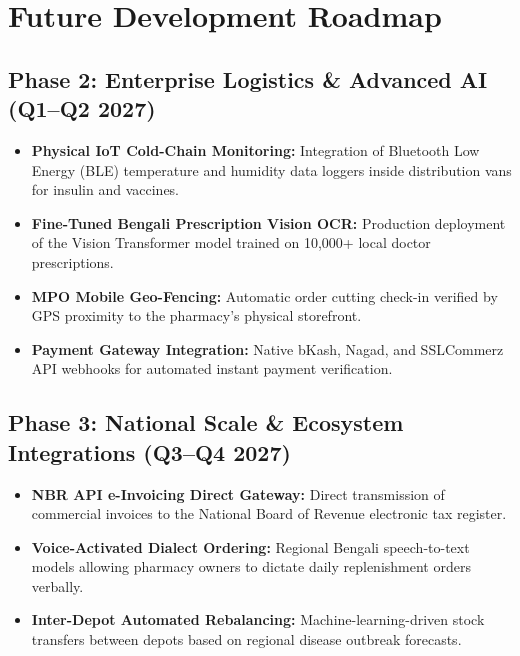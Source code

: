 \documentclass[10pt,a4paper]{article}
\begin{document}
\section{Future Development Roadmap}

\subsection{Phase 2: Enterprise Logistics \& Advanced AI (Q1--Q2 2027)}
\begin{itemize}[leftmargin=*]
    \item[$\square$] \textbf{Physical IoT Cold-Chain Monitoring:} Integration of Bluetooth Low Energy (BLE) temperature and humidity data loggers inside distribution vans for insulin and vaccines.
    \item[$\square$] \textbf{Fine-Tuned Bengali Prescription Vision OCR:} Production deployment of the Vision Transformer model trained on 10,000+ local doctor prescriptions.
    \item[$\square$] \textbf{MPO Mobile Geo-Fencing:} Automatic order cutting check-in verified by GPS proximity to the pharmacy's physical storefront.
    \item[$\square$] \textbf{Payment Gateway Integration:} Native bKash, Nagad, and SSLCommerz API webhooks for automated instant payment verification.
\end{itemize}

\subsection{Phase 3: National Scale \& Ecosystem Integrations (Q3--Q4 2027)}
\begin{itemize}[leftmargin=*]
    \item[$\square$] \textbf{NBR API e-Invoicing Direct Gateway:} Direct transmission of commercial invoices to the National Board of Revenue electronic tax register.
    \item[$\square$] \textbf{Voice-Activated Dialect Ordering:} Regional Bengali speech-to-text models allowing pharmacy owners to dictate daily replenishment orders verbally.
    \item[$\square$] \textbf{Inter-Depot Automated Rebalancing:} Machine-learning-driven stock transfers between depots based on regional disease outbreak forecasts.
\end{itemize}
\end{document}
